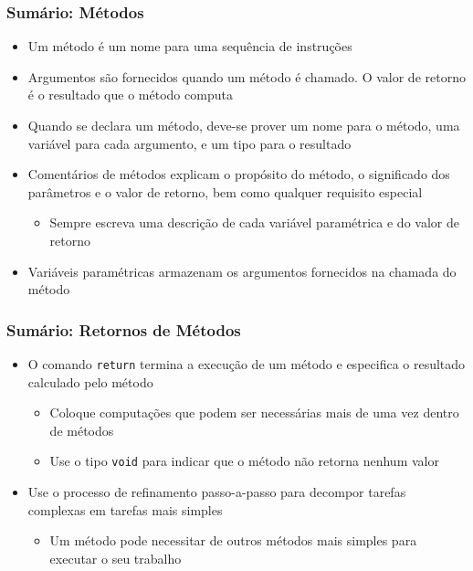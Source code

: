 \documentclass[xcolor={dvipsnames,table},aspectratio=169]{beamer}
\begin{document}
\begin{frame}\frametitle{Sumário: Métodos}
\begin{itemize}
	\item Um método é um nome para uma sequência de instruções
	\item Argumentos são fornecidos quando um método é chamado. O valor de retorno é o resultado que o método computa
	\item Quando se declara um método, deve-se prover um nome para o método, uma variável para cada argumento, e um tipo para o resultado
	\item Comentários de métodos explicam o propósito do método, o significado dos parâmetros e o valor de retorno, bem como qualquer requisito especial
    \begin{itemize}
		\item Sempre escreva uma descrição de cada variável paramétrica e do valor de retorno
    \end{itemize}
	\item Variáveis paramétricas armazenam os argumentos fornecidos na chamada do método
\end{itemize}
\end{frame}

\begin{frame}\frametitle{Sumário: Retornos de Métodos}
\begin{itemize}
	\item O comando \texttt{return} termina a execução de um método e especifica o resultado calculado pelo método
	\begin{itemize}
		\item Coloque computações que podem ser necessárias mais de uma vez dentro de métodos
		\item Use o tipo \texttt{void} para indicar que o método não retorna nenhum valor
	\end{itemize}
	\item Use o processo de refinamento passo-a-passo para decompor tarefas complexas em tarefas mais simples
	\begin{itemize}
		\item Um método pode necessitar de outros métodos mais simples para executar o seu trabalho
	\end{itemize}
\end{itemize}
\end{frame}
\end{document}
